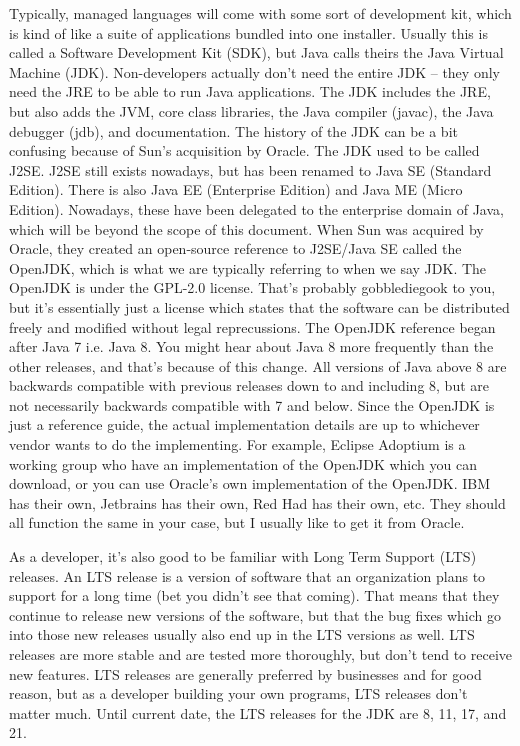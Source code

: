\documentclass{article}
\begin{document}
Typically, managed languages will come with some sort of development kit, which is kind of like a suite of
applications bundled into one installer. Usually this is called a Software Development Kit (SDK), but Java calls
theirs the Java Virtual Machine (JDK). Non-developers actually don’t need the entire JDK – they only need the
JRE to be able to run Java applications. The JDK includes the JRE, but also adds the JVM, core class libraries,
the Java compiler (javac), the Java debugger (jdb), and documentation. The history of the JDK can be a bit
confusing because of Sun’s acquisition by Oracle. The JDK used to be called J2SE. J2SE still exists nowadays,
but has been renamed to Java SE (Standard Edition). There is also Java EE (Enterprise Edition) and Java ME
(Micro Edition). Nowadays, these have been delegated to the enterprise domain of Java, which will be beyond
the scope of this document. When Sun was acquired by Oracle, they created an open-source reference to J2SE/Java
SE called the OpenJDK, which is what we are typically referring to when we say JDK. The OpenJDK is under the
GPL-2.0 license. That’s probably gobblediegook to you, but it’s essentially just a license which states that
the software can be distributed freely and modified without legal reprecussions. The OpenJDK reference began
after Java 7 i.e. Java 8. You might hear about Java 8 more frequently than the other releases, and that’s
because of this change. All versions of Java above 8 are backwards compatible with previous releases down to and
including 8, but are not necessarily backwards compatible with 7 and below. Since the OpenJDK is just a
reference guide, the actual implementation details are up to whichever vendor wants to do the implementing.
For example, Eclipse Adoptium is a working group who have an implementation of the OpenJDK which you can
download, or you can use Oracle’s own implementation of the OpenJDK. IBM has their own, Jetbrains has their
own, Red Had has their own, etc. They should all function the same in your case, but I usually like to get it
from Oracle.

As a developer, it’s also good to be familiar with Long Term Support (LTS) releases. An LTS release is a
version of software that an organization plans to support for a long time (bet you didn’t see that coming).
That means that they continue to release new versions of the software, but that the bug fixes which go into
those new releases usually also end up in the LTS versions as well. LTS releases are more stable and are tested
more thoroughly, but don’t tend to receive new features. LTS releases are generally preferred by businesses and
for good reason, but as a developer building your own programs, LTS releases don’t matter much. Until current
date, the LTS releases for the JDK are 8, 11, 17, and 21.
\end{document}
